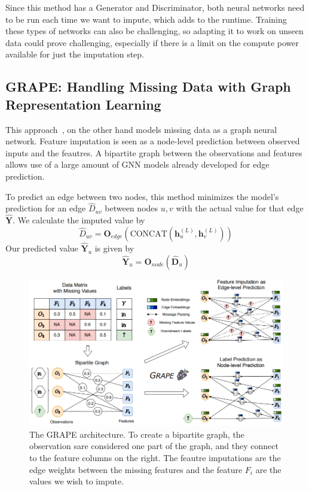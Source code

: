 \documentclass[12pt]{article}
\begin{document}
Since this method has a Generator and Discriminator, both neural networks need
to be run each time we want to impute, which adds to the runtime.
Training these types of networks can also be challenging, so adapting it
to work on unseen data could prove challenging, especially if there is a
limit on the compute power available for just the imputation step.

\subsection{GRAPE: Handling Missing Data with Graph Representation Learning}
This approach~\cite{you2020handling}, on the other hand models missing data 
as a graph neural network.
Feature imputation is seen as a node-level prediction between observed
inputs and the feautres. 
A bipartite graph between the observations and features allows use of 
a large amount of GNN models already developed for edge prediction.

To predict an edge between two nodes, this method minimizes the model's
prediction for an edge $\hat{D}_{uv}$ between nodes $u, v$ with the actual value for that edge
$\hat{\boldsymbol{Y}}$.
We calculate the imputed value by 
\[\hat{D}_{uv} = \boldsymbol{O}_{edge}(\textrm{CONCAT}(\boldsymbol{h}^{(L)}_u, \boldsymbol{h}^{(L)}_v))\]
Our predicted value $\hat{\boldsymbol{Y}}_u$ is given by 
\[\hat{\boldsymbol{Y}}_u = \boldsymbol{O}_{node}(\hat{\boldsymbol{D}}_u)\]

\begin{figure}
	\label{fig:grape_arch}
	\centering
	\includegraphics[scale=0.5]{grape_arch}
	\caption{The GRAPE architecture. To create a bipartite graph, the observation sare considered one
	part of the graph, and they connect to the feature columns on the right. The feautre imputations are 
	the edge weights between the missing features and the feature $F_i$ are the 
	values we wish to impute.}
\end{figure}
\end{document}
